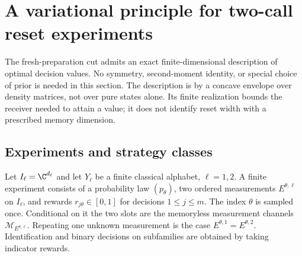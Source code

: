 \section{A variational principle for two-call reset experiments}
\label{sec:resetvariational91}
The fresh-preparation cut admits an exact finite-dimensional description
of optimal decision values.  No symmetry, second-moment identity, or
special choice of prior is needed in this section.  The description is
by a concave envelope over density matrices, not over pure states alone.
Its finite realization bounds the receiver needed to attain a value;
it does not identify reset width with a prescribed memory dimension.

\subsection{Experiments and strategy classes}
Let $I_\ell=\C^{d_\ell}$ and let $Y_\ell$ be a finite classical alphabet,
$\ell=1,2$.  A finite experiment consists of a probability law
$(p_\theta)$, two ordered measurements $E^{\theta,\ell}$ on $I_\ell$,
and rewards $r_{j\theta}\in[0,1]$ for decisions $1\le j\le m$.
The index $\theta$ is sampled once.  Conditional on it the two slots are
the memoryless measurement channels $\mathcal M_{E^{\theta,\ell}}$.
Repeating one unknown measurement is the case
$E^{\theta,1}=E^{\theta,2}$.  Identification and binary decisions on
subfamilies are obtained by taking indicator rewards.

